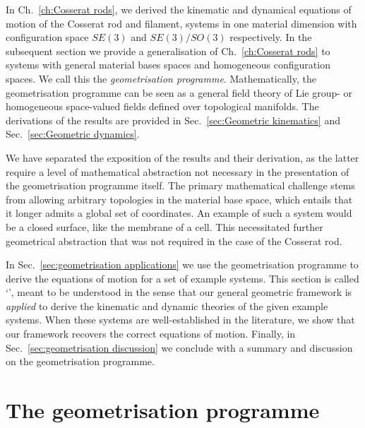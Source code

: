 In Ch.~\ref{ch:Cosserat rods}, we derived the kinematic and dynamical equations of motion of the Cosserat rod and filament, systems in one material dimension with configuration space $SE(3)$ and $SE(3)/SO(3)$ respectively. In the subsequent section we provide a generalisation of Ch.~\ref{ch:Cosserat rods} to systems with general material bases spaces and homogeneous configuration spaces. We call this the \textit{geometrisation programme}. Mathematically, the geometrisation programme can be seen as a general field theory of Lie group- or homogeneous space-valued fields defined over topological manifolds. The derivations of the results are provided in Sec.~\ref{sec:Geometric kinematics} and Sec.~\ref{sec:Geometric dynamics}. 

We have separated the exposition of the results and their derivation, as the latter require a level of mathematical abstraction not necessary in the presentation of the geometrisation programme itself. The primary mathematical challenge stems from allowing arbitrary topologies in the material base space, which entails that it longer admits a global set of coordinates. An example of such a system would be a closed surface, like the membrane of a cell. This necessitated further geometrical abstraction that was not required in the case of the Cosserat rod. 

In Sec.~\ref{sec:geometrisation applications} we use the geometrisation programme to derive the equations of motion for a set of example systems. This section is called `', meant to be understood in the sense that our general geometric framework is \emph{applied} to derive the kinematic and dynamic theories of the given example systems. When these systems are well-established in the literature, we show that our framework recovers the correct equations of motion. Finally, in Sec.~\ref{sec:geometrisation discussion} we conclude with a summary and discussion on the geometrisation programme.

\section{The geometrisation programme} \label{sec:The geometrisation programme}

